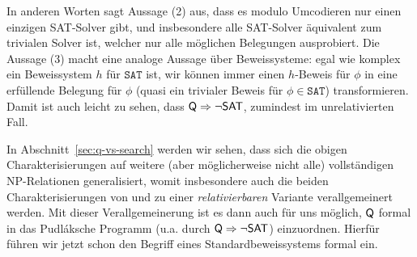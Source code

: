 In anderen Worten sagt Aussage (2) aus, dass es modulo Umcodieren nur einen einzigen SAT-Solver gibt, und insbesondere alle SAT-Solver äquivalent zum trivialen Solver ist, welcher nur alle möglichen Belegungen ausprobiert.
Die Aussage (3) macht eine analoge Aussage über Beweissysteme: egal wie komplex ein Beweissystem $h$ für $\mathtt{SAT}$ ist, wir können immer einen $h$-Beweis für $\phi$ in eine erfüllende Belegung für $\phi$ (quasi ein trivialer Beweis für $\phi\in\mathtt{SAT}$) transformieren. Damit ist auch leicht zu sehen, dass $\mathsf{Q}\Rightarrow \neg\mathsf{SAT}$, zumindest im unrelativierten Fall.

In Abschnitt~\ref{sec:q-vs-search} werden wir sehen, dass sich die obigen Charakterisierungen auf weitere (aber möglicherweise nicht alle) vollständigen NP-Relationen generalisiert, womit insbesondere auch die beiden Charakterisierungen von \citeauthor{fenner_inverting_2003} und \citeauthor{messner_simulation_2001} zu einer \emph{relativierbaren} Variante verallgemeinert werden.
Mit dieser Verallgemeinerung ist es dann auch für uns möglich, $\mathsf{Q}$ formal in das Pudláksche Programm (u.a. durch $\mathsf{Q}\Rightarrow \neg\mathsf{SAT}$) einzuordnen. Hierfür führen wir jetzt schon den Begriff eines Standardbeweissystems formal ein.

